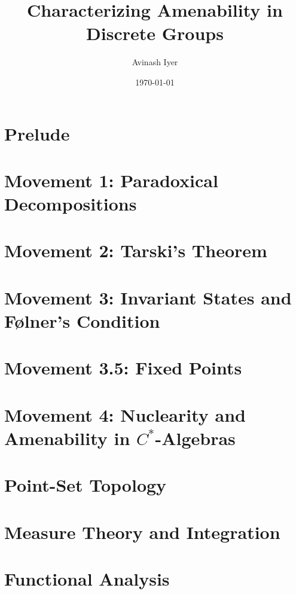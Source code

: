 \documentclass[10pt]{package2}
\title{Characterizing Amenability in Discrete Groups}
\author{Avinash Iyer}
\date{\today}
\newcommand{\1}{\mathds{1}}
\begin{document}
\maketitle
\RaggedRight
\tableofcontents
\chapter{Prelude}
%
\chapter{Movement 1: Paradoxical Decompositions}

\chapter{Movement 2: Tarski's Theorem}

\chapter{Movement 3: Invariant States and Følner's Condition}

\chapter{Movement 3.5: Fixed Points}
\chapter{Movement 4: Nuclearity and Amenability in $C^{\ast}$-Algebras}
\appendix
\chapter{Point-Set Topology}

\chapter{Measure Theory and Integration}

\chapter{Functional Analysis}
\nocite{*}
\printbibliography
\end{document}
